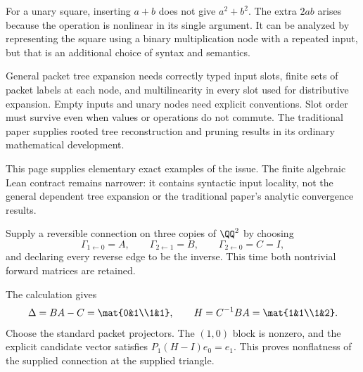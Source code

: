 
For a unary square, inserting $a+b$ does not give $a^2+b^2$. The extra $2ab$ arises because the operation is nonlinear in its single argument. It can be analyzed by representing the square using a binary multiplication node with a repeated input, but that is an additional choice of syntax and semantics.

General packet tree expansion needs correctly typed input slots, finite sets of packet labels at each node, and multilinearity in every slot used for distributive expansion. Empty inputs and unary nodes need explicit conventions. Slot order must survive even when values or operations do not commute. The traditional paper supplies rooted tree reconstruction and pruning results in its ordinary mathematical development.

This page supplies elementary exact examples of the issue. The finite algebraic Lean contract remains narrower: it contains syntactic input locality, not the general dependent tree expansion or the traditional paper's analytic convergence results.


Supply a reversible connection on three copies of $\QQ^2$ by choosing
\[
\Gamma_{1\leftarrow0}=A,\qquad\Gamma_{2\leftarrow1}=B,
\qquad\Gamma_{2\leftarrow0}=C=I,
\]
and declaring every reverse edge to be the inverse. This time both nontrivial forward matrices are retained.


The calculation gives
\[
\Delta=BA-C=\mat{0&1\\1&1},\qquad H=C^{-1}BA=\mat{1&1\\1&2}.
\]
Choose the standard packet projectors. The $(1,0)$ block is nonzero, and the explicit candidate vector satisfies $P_1(H-I)e_0=e_1$. This proves nonflatness of the supplied connection at the supplied triangle.

